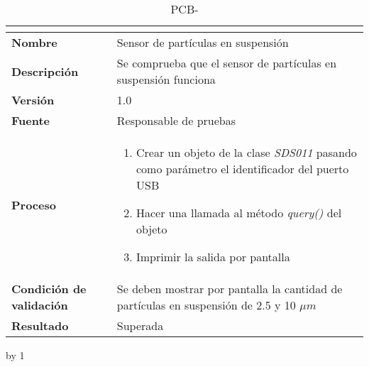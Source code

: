 \begin{table}[H]
	\caption{PCB-\number\pcb}
	\begin{tabular}{|l|p{}|}
		\hline
		\multicolumn{2}{|c|}{\cellcolor[HTML]{BFBFBF}{\color[HTML]{000000} \textbf{PCB-\number\pcb}}} \\ \hline
		\textbf{Nombre}                  & Sensor de partículas en suspensión                                                        \\ \hline
		\textbf{Descripción}             & Se comprueba que el sensor de partículas en suspensión funciona                           \\ \hline
		\textbf{Versión}                 & 1.0                                                                                       \\ \hline
		\textbf{Fuente}                  & Responsable de pruebas                                                                    \\ \hline
		\textbf{Proceso}                 & \begin{enumerate}
			\item Crear un objeto de la clase \textit{SDS011} pasando como parámetro el identificador del puerto USB
			\item Hacer una llamada al método \textit{query()} del objeto
			\item Imprimir la salida por pantalla
		\end{enumerate}                                                                \\ \hline
		\textbf{Condición de validación} & Se deben mostrar por pantalla la cantidad de partículas en suspensión de 2.5 y 10 $\mu m$ \\ \hline
		\textbf{Resultado}               & Superada                                                                                  \\ \hline
	\end{tabular}
\end{table}
\advance\pcb by 1
